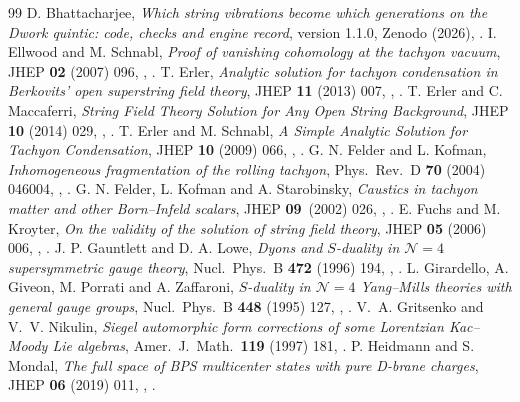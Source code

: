 \begin{thebibliography}{99}
 D. Bhattacharjee, \emph{Which string vibrations become which generations on the Dwork quintic: code, checks and engine record}, version 1.1.0, Zenodo (2026), .
 I. Ellwood and M. Schnabl, \emph{Proof of vanishing cohomology at the tachyon vacuum}, JHEP \textbf{02} (2007) 096, , .
 T. Erler, \emph{Analytic solution for tachyon condensation in Ber\-ko\-vits' open superstring field theory}, JHEP \textbf{11} (2013) 007, , .
 T. Erler and C. Maccaferri, \emph{String Field Theory Solution for Any Open String Background}, JHEP \textbf{10} (2014) 029, , .
 T. Erler and M. Schnabl, \emph{A Simple Analytic Solution for Tachyon Condensation}, JHEP \textbf{10} (2009) 066, , .
 G. N. Felder and L. Kofman, \emph{Inhomogeneous fragmentation of the rolling tachyon}, Phys.\ Rev.\ D \textbf{70} (2004) 046004, , .
 G. N. Felder, L. Kofman and A. Starobinsky, \emph{Caustics in ta\-chy\-on matter and other Born--In\-feld scalars}, JHEP \textbf{09}~(2002) 026, , .
 E. Fuchs and M. Kroyter, \emph{On the validity of the solution of string field theory}, JHEP \textbf{05} (2006) 006, , .
 J. P. Gauntlett and D. A. Lowe, \emph{Dyons and $S$-duality in $\mathcal N=4$ supersymmetric gauge theory}, Nucl.\ Phys.\ B \textbf{472} (1996) 194, , .
 L. Girardello, A. Giveon, M. Porrati and A. Zaffaroni, \emph{$S$-duality in $\mathcal N=4$ Yang--Mills theories with general gauge groups}, Nucl.\ Phys.\ B \textbf{448} (1995) 127, , .
 V.~A. Gritsenko and V.~V. Nikulin, \emph{Siegel automorphic form corrections of some Lorentzian Kac--Moody Lie algebras}, Amer.\ J.\ Math.\ \textbf{119} (1997) 181, .
 P. Heidmann and S. Mondal, \emph{The full space of BPS multicenter states with pure D-brane charges}, JHEP \textbf{06} (2019) 011, , .

\end{thebibliography}
